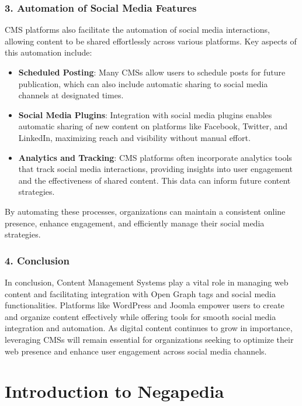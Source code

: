 \subsubsection{3. Automation of Social Media Features}

CMS platforms also facilitate the automation of social media interactions, allowing content to be shared effortlessly across various platforms. Key aspects of this automation include:

\begin{itemize}
    \item \textbf{Scheduled Posting}: Many CMSs allow users to schedule posts for future publication, which can also include automatic sharing to social media channels at designated times.
    \item \textbf{Social Media Plugins}: Integration with social media plugins enables automatic sharing of new content on platforms like Facebook, Twitter, and LinkedIn, maximizing reach and visibility without manual effort.
    \item \textbf{Analytics and Tracking}: CMS platforms often incorporate analytics tools that track social media interactions, providing insights into user engagement and the effectiveness of shared content. This data can inform future content strategies.
\end{itemize}

By automating these processes, organizations can maintain a consistent online presence, enhance engagement, and efficiently manage their social media strategies.

\subsubsection{4. Conclusion}

In conclusion, Content Management Systems play a vital role in managing web content and facilitating integration with Open Graph tags and social media functionalities. Platforms like WordPress and Joomla empower users to create and organize content effectively while offering tools for smooth social media integration and automation. As digital content continues to grow in importance, leveraging CMSs will remain essential for organizations seeking to optimize their web presence and enhance user engagement across social media channels.


\section{Introduction to Negapedia}
\label{sec:introduction_to_negapedia}

